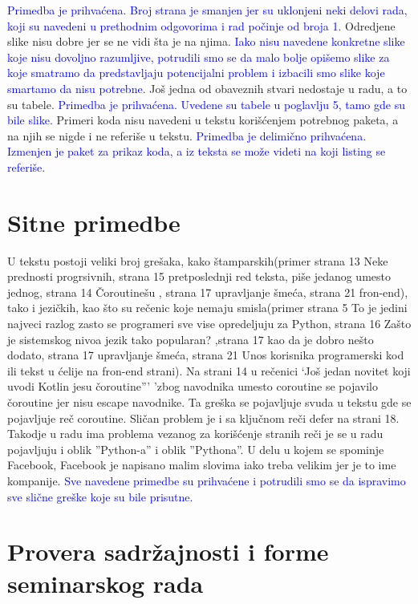 \documentclass[a4paper]{report}
\newcommand{\odgovor}[1]{\textcolor{blue}{#1}}
\begin{document}
\odgovor{Primedba je prihvaćena. Broj strana je smanjen jer su uklonjeni neki delovi rada, koji su navedeni u prethodnim odgovorima i rad počinje od broja 1.}
Odredjene slike nisu dobre jer se ne vidi šta je na njima.
\odgovor{Iako nisu navedene konkretne slike koje nisu dovoljno razumljive, potrudili smo se da malo bolje opišemo slike za koje smatramo da predstavljaju potencijalni problem i izbacili smo slike koje smartamo da nisu potrebne.} 
Još jedna od obaveznih stvari nedostaje u radu, a to su tabele.
\odgovor{Primedba je prihvaćena. Uvedene su tabele u poglavlju 5, tamo gde su bile slike.}
Primeri koda nisu navedeni u tekstu korišćenjem potrebnog paketa, a na njih se nigde i ne referiše u tekstu.
\odgovor{Primedba je delimično prihvaćena. Izmenjen je paket za prikaz koda, a iz teksta se može videti na koji listing se referiše. }

\section{Sitne primedbe}
U tekstu postoji veliki broj grešaka, kako štamparskih(primer strana 13  Neke prednosti progrsivnih, strana 15 pretposlednji red teksta, piše jedanog umesto jednog, strana 14 Čoroutinešu , strana 17  upravljanje šmeća, strana 21 fron-end), tako i jezičkih, kao što su rečenic koje nemaju smisla(primer strana  5 To je jedini najveci razlog zasto se programeri sve vise opredeljuju za Python, strana 16 Zašto je sistemskog nivoa jezik tako popularan? ,strana 17  kao da je dobro nešto dodato, strana 17  upravljanje šmeća, strana 21 Unos korisnika programerski kod ili tekst u ćelije na fron-end strani). Na strani 14 u rečenici  `Još jedan novitet koji uvodi Kotlin jesu čoroutine”' 'zbog navodnika umesto coroutine se pojavilo čoroutine jer nisu escape navodnike. Ta greška se pojavljuje svuda u tekstu gde se pojavljuje reč coroutine. Sličan problem je i sa ključnom reči defer na strani 18. Takodje u radu ima problema vezanog za korišćenje stranih reči je se u radu pojavljuju i oblik ”Python-a” i oblik ”Pythona”. U delu u kojem se spominje Facebook, Facebook je napisano malim slovima iako treba velikim jer je to ime kompanije.
\odgovor{Sve navedene primedbe su prihvaćene i potrudili smo se da ispravimo sve slične greške koje su bile prisutne.}
\section{Provera sadržajnosti i forme seminarskog rada}
\end{document}
